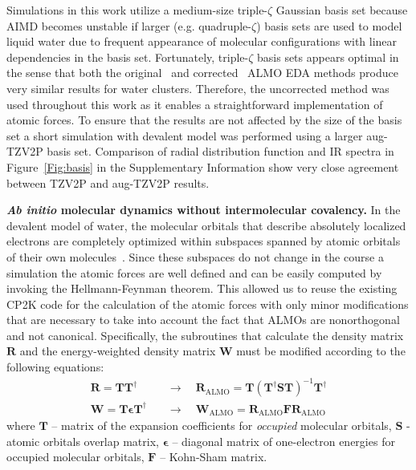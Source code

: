 \documentclass[aps,prl,reprint,amsmath,amssymb]{revtex4-1}
\begin{document}
Simulations in this work utilize a medium-size triple-$\zeta$ Gaussian basis set because AIMD becomes unstable if larger (e.g. quadruple-$\zeta$) basis sets are used to model liquid water due to frequent appearance of molecular configurations with linear dependencies in the basis set. 
Fortunately, triple-$\zeta$ basis sets appears optimal in the sense that both the original~\cite{khaliullin2007unravelling} and corrected~\cite{horn2015polarization} ALMO EDA methods produce very similar results for water clusters. 
Therefore, the uncorrected method was used throughout this work as it enables a straightforward implementation of atomic forces. 
To ensure that the results are not affected by the size of the basis set a short simulation with devalent model was performed using a larger aug-TZV2P basis set. Comparison of radial distribution function and IR spectra in Figure~\ref{Fig:basis} in the Supplementary Information show very close agreement between TZV2P and aug-TZV2P results. 


\textbf{\textit{Ab initio} molecular dynamics without intermolecular covalency.} In the devalent model of water, the molecular orbitals that describe absolutely localized electrons are completely optimized within subspaces spanned by atomic orbitals of their own molecules~\cite{khaliullin2006efficient}. Since these subspaces do not change in the course a simulation the atomic forces are well defined and can be easily computed by invoking the Hellmann-Feynman theorem. This allowed us to reuse the existing CP2K code for the calculation of the atomic forces with only minor modifications that are necessary to take into account the fact that ALMOs are nonorthogonal and not canonical. Specifically, the subroutines that calculate the density matrix $\mathbf{R}$ and the energy-weighted density matrix $\mathbf{W}$ must be modified according to the following equations:
%
\begin{equation}
\begin{split}
\mathbf{R} = \mathbf{T} \mathbf{T}^{\dagger} \quad &\rightarrow \quad \mathbf{R}_{\text{ALMO}} = \mathbf{T} (\mathbf{T}^{\dagger} \mathbf{S} \mathbf{T})^{-1}\mathbf{T}^{\dagger} \\
\mathbf{W} = \mathbf{T} \mathbf{\epsilon} \mathbf{T}^{\dagger} \quad &\rightarrow \quad \mathbf{W}_{\text{ALMO}}  = \mathbf{R}_{\text{ALMO}} \mathbf{F} \mathbf{R}_{\text{ALMO}}
\end{split}
\end{equation}
%
where $\mathbf{T}$ -- matrix of the expansion coefficients for \emph{occupied} molecular orbitals, $\mathbf{S}$ - atomic orbitals overlap matrix, $\mathbf{\epsilon}$ -- diagonal matrix of one-electron energies for occupied molecular orbitals, $\mathbf{F}$ -- Kohn-Sham matrix.
\end{document}
